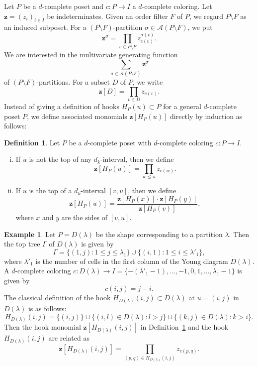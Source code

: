 \documentclass[10pt]{amsart}
\theoremstyle{definition}
\newtheorem{defi}[theo]{Definition}
\newtheorem{exam}[theo]{Example}
\theoremstyle{remark}
\newcommand\vectz{\boldsymbol{z}}
\newcommand\AP{\mathcal{A}}
\begin{document}
Let $P$ be a $d$-complete poset and 
$c : P \to I$ a $d$-complete coloring.
Let $\vectz = (z_i)_{i \in I}$ be indeterminates.
Given an order filter $F$ of $P$, we regard $P \setminus F$ as an induced subposet.
For a $(P \setminus F)$-partition $\sigma \in \AP(P \setminus F)$, we put
$$
\vectz^\sigma = \prod_{v \in P \setminus F} z_{c(v)}^{\sigma(v)}.
$$
We are interested in the multivariate generating function
$$
\sum_{\sigma \in \AP(P \setminus F)} \vectz^\sigma
$$
of $(P \setminus F)$-partitions.
For a subset $D$ of $P$, we write
$$
\vectz[D] = \prod_{v \in D} z_{c(v)}.
$$
Instead of giving a definition of hooks $H_P(u) \subset P$ for a general 
$d$-complete poset $P$, we define associated monomials $\vectz[H_P(u)]$ 
directly by induction as follows:

\begin{defi}
\label{def:hook}
Let $P$ be a $d$-complete poset with $d$-complete coloring $c : P \to I$.
\begin{enumerate}[(i)]
\item\label{defi2.6_i} %
If $u$ is not the top of any $d_k$-interval, then we define
$$
\vectz[H_P(u)] = \prod_{w \le u} z_{c(w)}.
$$
\item\label{defi2.6_ii} %
If $u$ is the top of a $d_k$-interval $[v,u]$, then we define
$$
\vectz[H_P(u)]
 =
\frac{ \vectz[H_P(x)] \cdot \vectz[H_P(y)] }
 { \vectz[H_P(v)] },
$$
where $x$ and $y$ are the sides of $[v,u]$.
\end{enumerate}
\end{defi}

\begin{exam}
\label{ex:shape_hc}
Let $P = D(\lambda)$ be the shape corresponding to a partition $\lambda$.
Then the top tree $\Gamma$ of $D(\lambda)$ is given by
$$
\Gamma = \{ (1,j) : 1 \le j \le \lambda_1 \} \cup \{ (i,1) : 1 \le i \le \lambda'_1 \},
$$
where $\lambda'_1$ is the number of cells in the first column of the Young diagram $D(\lambda)$.
A $d$-complete coloring $c: D(\lambda) \to I = \{ -(\lambda'_1-1), \dots, -1, 0, 1, \dots, \lambda_1-1 \}$ 
is given by
$$
c(i,j) = j-i.
$$
The classical definition of the hook $H_{D(\lambda)}(i,j) \subset D(\lambda)$ 
at $u = (i,j)$ in $D(\lambda)$ is as follows:
$$
H_{D(\lambda)}(i,j)
 =
\{ (i,j) \}
\cup
\{ (i,l) \in D(\lambda) : l > j \}
\cup
\{ (k,j) \in D(\lambda) : k > i \}.
$$
Then the hook monomial $\vectz[H_{D(\lambda)}(i,j)]$ in Definition~\ref{def:hook} 
and the hook $H_{D(\lambda)}(i,j)$ are related as 
$$
\vectz[H_{D(\lambda)}(i,j)]
 =
\prod_{(p,q)\in H_{D(\lambda)}(i,j) } z_{c(p,q)}.
$$
\end{exam}
\end{document}
